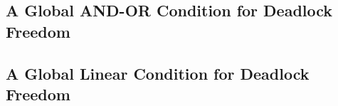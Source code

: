 \en






   \subsection{A Global AND-OR Condition for Deadlock Freedom}
   \label{s:global.ANDOR}
   




   \subsection{A Global Linear Condition for Deadlock Freedom}
   \label{s:globCondition}
   \label{s:global.Linear}
   

